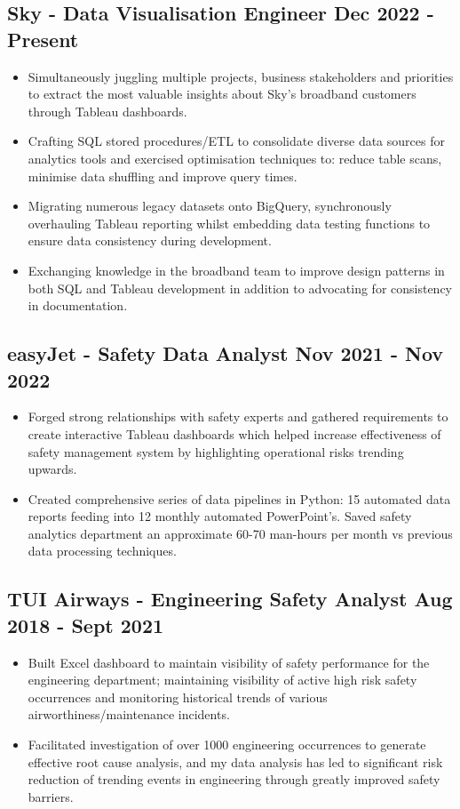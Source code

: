 \documentclass[a4paper,9pt]{article}
\begin{document}
\subsection*{\textbf{Sky - Data Visualisation Engineer} \hfill  Dec 2022 - Present}
\begin{itemize}[noitemsep]
    \item Simultaneously juggling multiple projects, business stakeholders and priorities to extract the most valuable insights about Sky's broadband customers through Tableau dashboards.
    \item Crafting SQL stored procedures/ETL to consolidate diverse data sources for analytics tools and exercised optimisation techniques to: reduce table scans, minimise data shuffling and improve query times.
    \item Migrating numerous legacy datasets onto BigQuery, synchronously overhauling Tableau reporting whilst embedding data testing functions to ensure data consistency during development.
    \item Exchanging knowledge in the broadband team to improve design patterns in both SQL and Tableau development in addition to advocating for consistency in documentation.
\end{itemize}

\subsection*{\textbf{easyJet - Safety Data Analyst} \hfill  Nov 2021 - Nov 2022}
\begin{itemize}[noitemsep]
    \item Forged strong relationships with safety experts and gathered requirements to create interactive Tableau dashboards which helped increase effectiveness of safety management system by highlighting operational risks trending upwards.
    \item Created comprehensive series of data pipelines in Python: 15 automated data reports feeding into 12 monthly automated PowerPoint's. Saved safety analytics department an approximate 60-70 man-hours per month vs previous data processing techniques.
\end{itemize}

\subsection*{\textbf{TUI Airways - Engineering Safety Analyst} \hfill  Aug 2018 - Sept 2021}
\begin{itemize}[noitemsep]
	\item Built Excel dashboard to maintain visibility of safety performance for the engineering department; maintaining visibility of active high risk safety occurrences and monitoring historical trends of various airworthiness/maintenance incidents.
	\item Facilitated investigation of over 1000 engineering occurrences to generate effective root cause analysis, and my data analysis has led to significant risk reduction of trending events in engineering through greatly improved safety barriers.
\end{itemize}
\end{document}
